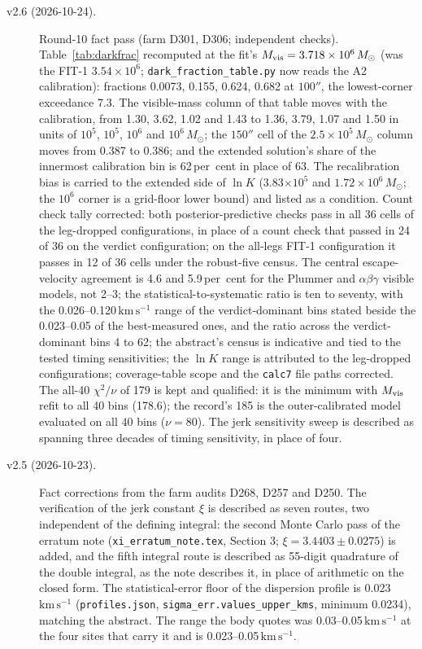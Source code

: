 \documentclass[11pt]{article}
\newcommand{\msun}{\ensuremath{M_\odot}}
\newcommand{\lnK}{\ensuremath{\ln K}}
\newcommand{\kms}{\ensuremath{\mathrm{km\,s^{-1}}}}
\begin{document}
\begin{description}
\item[v2.6 (2026-10-24).] Round-10 fact pass (farm D301, D306; independent checks). Table~\ref{tab:darkfrac} recomputed at the fit's $M_{\rm vis} = 3.718\times10^{6}\,\msun$ (was the FIT-1 $3.54\times10^{6}$; \texttt{dark\_fraction\_table.py} now reads the A2 calibration): fractions 0.0073, 0.155, 0.624, 0.682 at $100''$, the lowest-corner exceedance 7.3. The visible-mass column of that table moves with the calibration, from 1.30, 3.62, 1.02 and 1.43 to 1.36, 3.79, 1.07 and 1.50 in units of $10^{5}$, $10^{5}$, $10^{6}$ and $10^{6}\,\msun$; the $150''$ cell of the $2.5\times10^{5}\,\msun$ column moves from 0.387 to 0.386; and the extended solution's share of the innermost calibration bin is 62\,per~cent in place of 63. The recalibration bias is carried to the extended side of $\lnK$ (3.83$\times10^{5}$ and $1.72\times10^{6}\,\msun$; the $10^{6}$ corner is a grid-floor lower bound) and listed as a condition. Count check tally corrected: both posterior-predictive checks pass in all 36 cells of the leg-dropped configurations, in place of a count check that passed in 24 of 36 on the verdict configuration; on the all-legs FIT-1 configuration it passes in 12 of 36 cells under the robust-five census. The central escape-velocity agreement is 4.6 and 5.9\,per~cent for the Plummer and $\alpha\beta\gamma$ visible models, not 2--3; the statistical-to-systematic ratio is ten to seventy, with the 0.026--0.120\,\kms{} range of the verdict-dominant bins stated beside the 0.023--0.05 of the best-measured ones, and the ratio across the verdict-dominant bins 4 to 62; the abstract's census is indicative and tied to the tested timing sensitivities; the $\lnK$ range is attributed to the leg-dropped configurations; coverage-table scope and the \texttt{calc7} file paths corrected. The all-40 $\chi^{2}/\nu$ of 179 is kept and qualified: it is the minimum with $M_{\rm vis}$ refit to all 40 bins (178.6); the record's 185 is the outer-calibrated model evaluated on all 40 bins ($\nu = 80$). The jerk sensitivity sweep is described as spanning three decades of timing sensitivity, in place of four.
\item[v2.5 (2026-10-23).] Fact corrections from the farm audits D268, D257 and D250. The verification of the jerk constant $\xi$ is described as seven routes, two independent of the defining integral: the second Monte Carlo pass of the erratum note (\texttt{xi\_erratum\_note.tex}, Section 3; $\xi = 3.4403 \pm 0.0275$) is added, and the fifth integral route is described as 55-digit quadrature of the double integral, as the note describes it, in place of arithmetic on the closed form. The statistical-error floor of the dispersion profile is 0.023\,\kms{} (\texttt{profiles.json}, \texttt{sigma\_err.values\_upper\_kms}, minimum 0.0234), matching the abstract. The range the body quotes was 0.03--0.05\,\kms{} at the four sites that carry it and is 0.023--0.05\,\kms{}.

\end{description}
\end{document}
